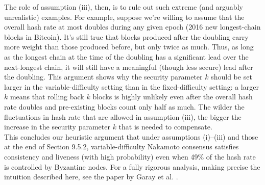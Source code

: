 The role of assumption (iii), then, is to rule out such extreme (and arguably unrealistic)
examples. For example, suppose we’re willing to assume that the overall hash rate at most
doubles during any given epoch (2016 new longest-chain blocks in Bitcoin). It’s still true
that blocks produced after the doubling carry more weight than those produced before, but
only twice as much. Thus, as long as the longest chain at the time of the doubling has
a significant lead over the next-longest chain, it will still have a meaningful (though less
secure) lead after the doubling. This argument shows why the security parameter $k$ should
be set larger in the variable-difficulty setting than in the fixed-difficulty setting: a larger $k$ means that rolling back $k$ blocks is highly unlikely even after the overall hash rate doubles and pre-existing blocks count only half as much. The wilder the fluctuations in hash rate
that are allowed in assumption (iii), the bigger the increase in the security parameter $k$ that
is needed to compensate.\\

This concludes our heuristic argument that under assumptions (i)–(iii) and those at the
end of Section 9.5.2, variable-difficulty Nakamoto consensus satisfies consistency and liveness
(with high probability) even when 49\% of the hash rate is controlled by Byzantine nodes.
For a fully rigorous analysis, making precise the intuition described here, see the paper by
Garay et al. .\\


